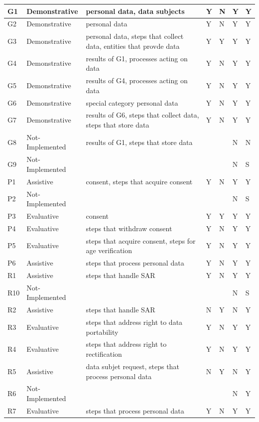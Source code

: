 \begin{center}
\begin{tabularx}{\textwidth}{|l|l|X|l|l|l|l|}
G1 & Demonstrative & personal data, data subjects & Y & N & Y & Y \\ \hline
G2 & Demonstrative & personal data & Y & N & Y & Y \\ \hline
G3 & Demonstrative & personal data, steps that collect data, entities that provde data & Y & Y & Y & Y \\ \hline
G4 & Demonstrative & results of G1, processes acting on data & Y & N & Y & Y \\ \hline
G5 & Demonstrative & results of G4, processes acting on data & Y & N & Y & Y \\ \hline
G6 & Demonstrative & special category personal data & Y & N & Y & Y \\ \hline
G7 & Demonstrative & results of G6, steps that collect data, steps that store data & Y & N & Y & Y \\ \hline
G8 & Not-Implemented & results of G1, steps that store data &  &  & N & N \\ \hline
G9 & Not-Implemented &  &  &  & N & S \\ \hline
P1 & Assistive & consent, steps that acquire consent & Y & N & Y & Y \\ \hline
P2 & Not-Implemented &  &  &  & N & S \\ \hline
P3 & Evaluative & consent & Y & Y & Y & Y \\ \hline
P4 & Evaluative & steps that withdraw consent & Y & N & Y & Y \\ \hline
P5 & Evaluative & steps that acquire consent, steps for age verification & Y & N & Y & Y \\ \hline
P6 & Assistive & steps that process personal data & Y & N & Y & Y \\ \hline
R1 & Assistive & steps that handle SAR & Y & N & Y & Y \\ \hline
R10 & Not-Implemented &  &  &  & N & S \\ \hline
R2 & Assistive & steps that handle SAR & N & Y & N & Y \\ \hline
R3 & Evaluative & steps that address right to data portability & Y & N & Y & Y \\ \hline
R4 & Evaluative & steps that address right to rectification & Y & N & Y & Y \\ \hline
R5 & Assistive & data subjet request, steps that process personal data & N & Y & N & Y \\ \hline
R6 & Not-Implemented &  &  &  & N & Y \\ \hline
R7 & Evaluative & steps that process personal data & Y & N & Y & Y \\ \hline

\end{tabularx}
\end{center}
